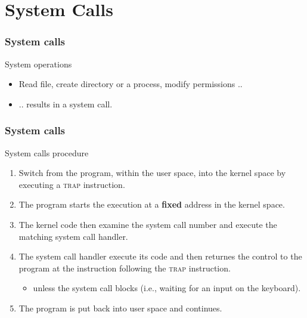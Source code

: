 \section{System Calls}
\begin{frame}
  \frametitle{System calls}
  \begin{block}{System operations}
    \begin{itemize}
      \item Read file, create directory or a process, modify permissions ..
      \item .. results in a system call.
    \end{itemize}
  \end{block}
\end{frame}

\begin{frame}
  \frametitle{System calls}
  \begin{block}{System calls procedure}
    \begin{enumerate}
      \item Switch from the program, within the user space, into the kernel space by executing a \textsc{trap} instruction.
      \item The program starts the execution at a \textbf{fixed} address in the kernel space.
      \item The kernel code then examine the system call number and execute the matching system call handler.
      \item The system call handler execute its code and then returnes the control to the program at the instruction following the \textsc{trap} instruction.
        \begin{itemize}
          \item unless the system call blocks (i.e., waiting for an input on the keyboard).
        \end{itemize}
      \item The program is put back into user space and continues.
    \end{enumerate}
  \end{block}
\end{frame}

